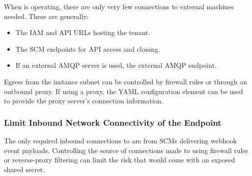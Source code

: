 When \cxoneflow is operating, there are only very few connections to external machines
needed.  These are generally:

\begin{itemize}
  \item The IAM and API URLs hosting the \cxone tenant.
  \item The SCM endpoints for API access and cloning.
  \item If an external AMQP server is used, the external AMQP endpoint.
\end{itemize}

Egress from the \cxoneflow instance subnet can be controlled by firewall rules or
through an outbound proxy.  If using a proxy, the 
YAML configuration element can be used to provide the proxy server's connection information.

\subsubsection{Limit Inbound Network Connectivity of the \cxoneflowtext\space Endpoint}

The only required inbound connections to \cxoneflow are from SCMs delivering webhook event
payloads.  Controlling the source of connections made to \cxoneflow using firewall rules
or reverse-proxy filtering can limit the risk that would come with an exposed shared secret.
